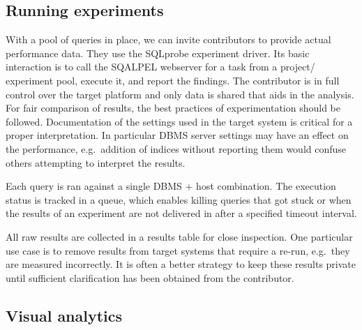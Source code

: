 \documentclass{cidr-2019}
\begin{document}
\subsection{Running experiments}
With a pool of queries in place, we can invite contributors to provide
actual performance data. They use the {\sc SQLprobe} experiment
driver. Its basic interaction is to call the {\sc SQALPEL} webserver
for a task from a project/ experiment pool, execute it, and report the
findings. The contributor is in full control over the target platform
and only data is shared that aids in the analysis. For fair
comparison of results, the best practices of experimentation should be
followed.
Documentation of the settings used in the target system is critical
for a proper interpretation. In particular DBMS server settings may
have an effect on the performance, e.g.\ addition of indices without
reporting them would confuse others attempting to interpret the
results.

Each query is ran against a single DBMS + host combination. The
execution status is tracked in a queue, which enables killing queries
that got stuck or when the results of an experiment are not delivered
in after a specified timeout interval.

All raw results are collected in a results table for close
inspection. One particular use case is to remove results from target
systems that require a re-run, e.g.\ they are measured incorrectly. It
is often a better strategy to keep these results private until
sufficient clarification has been obtained from the contributor.

\subsection{Visual analytics}
\end{document}
